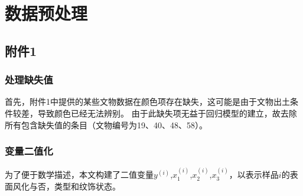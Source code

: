 \section{数据预处理} %
\label{sec:数据预处理}

\subsection{附件1} %
\label{sub:附件1}

\subsubsection{处理缺失值} %
\label{ssub:处理缺失值}

首先，附件1中提供的某些文物数据在颜色项存在缺失，这可能是由于文物出土条件较差，导致颜色已经无法辨别。
由于此缺失项无益于回归模型的建立，故去除所有包含缺失值的条目（文物编号为19、40、48、58）。


\subsubsection{变量二值化} %
\label{ssub:变量二值化}

为了便于数学描述，本文构建了二值变量$y^{(i)}$,$x^{(i)}_1$,$x^{(i)}_2$,$x^{(i)}_3$，以表示样品$i$的表面风化与否，类型和纹饰状态。

